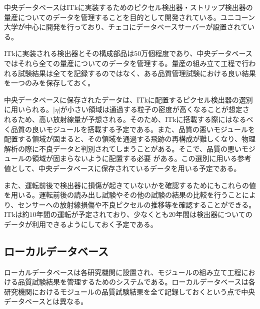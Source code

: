 中央データベースはITkに実装するためのピクセル検出器・ストリップ検出器の量産についてのデータを管理することを目的として開発されている。ユニコーン大学が中心に開発を行っており、チェコにデータベースサーバーが設置されている。

ITkに実装される検出器とその構成部品は$50$万個程度であり、中央データベースではそれら全ての量産についてのデータを管理する。量産の組み立て工程で行われる試験結果は全てを記録するのではなく、ある品質管理試験における良い結果を一つのみを保存しておく。

中央データベースに保存されたデータは、ITkに配置するピクセル検出器の選別に用いられる。$|\eta|$が小さい領域は通過する粒子の密度が高くなることが想定されるため、高い放射線量が予想される。そのため、ITkに搭載する際にはなるべく品質の良いモジュールを搭載する予定である。また、品質の悪いモジュールを配置する領域が固まると、その領域を通過する飛跡の再構成が難しくなり、物理解析の際に不良データと判別されてしまうことがある。そこで、品質の悪いモジュールの領域が固まらないように配置する必要
がある。この選別に用いる参考値として、中央データベースに保存されているデータを用いる予定である。

また、運転前後で検出器に損傷が起きていないかを確認するためにもこれらの値を用いる。運転前後の読み出し試験やその他の試験の結果の比較を行うことにより、センサーへの放射線損傷や不良ピクセルの推移等を確認することができる。
ITkは約$10$年間の運転が予定されており、少なくとも$20$年間は検出器についてのデータが利用できるようにしておく予定である。



\subsection{ローカルデータベース}
\label{sec:LocalDB}

ローカルデータベースは各研究機関に設置され、モジュールの組み立て工程における品質試験結果を管理するためのシステムである。ローカルデータベースは各研究機関におけるモジュールの品質試験結果を全て記録しておくという点で中央データベースとは異なる。

